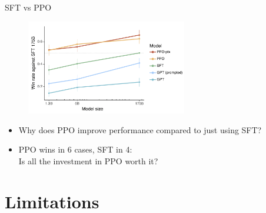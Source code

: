 \begin{vbframe}{SFT vs PPO}

\vfill

\begin{figure}
\centering
\includegraphics[width = 7cm]{figure/mainresult.png}
\end{figure}

\begin{itemize}
        \item \ques Why does PPO improve performance compared to
        just using SFT?
        \item PPO wins in 6 cases, SFT in 4:\\ Is all the
        investment in PPO worth it?
\end{itemize}

\vfill

\end{vbframe}





\section{Limitations}











